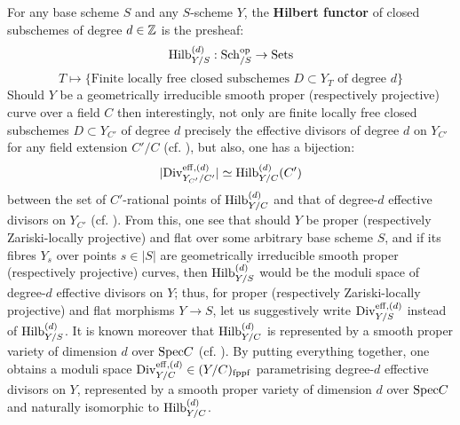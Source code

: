             \begin{remark} \label{remark: moduli_space_of_effective_divisors}
                For any base scheme $S$ and any $S$-scheme $Y$, the \textbf{Hilbert functor} of closed subschemes of degree $d \in \mathbb{Z}$ is the presheaf:
                    $$\mathrm{Hilb}_{Y/S}^{(d)}: \mathrm{Sch}_{/S}^{\mathrm{op}} \to \mathrm{Sets}$$
                    $$T \mapsto \{\text{Finite locally free closed subschemes $D \subset Y_T$ of degree $d$}\}$$
                Should $Y$ be a geometrically irreducible smooth proper (respectively projective) curve over a field $C$ then interestingly, not only are finite locally free closed subschemes $D \subset Y_{C'}$ of degree $d$ precisely the effective divisors of degree $d$ on $Y_{C'}$ for any field extension $C'/C$ (cf. \cite[\href{https://stacks.math.columbia.edu/tag/0B9D}{Tag 0B9D}]{stacks}), but also, one has a bijection:
                    $$|\mathrm{Div}_{Y_{C'}/C'}^{\mathrm{eff}, (d)}| \simeq \mathrm{Hilb}_{Y/C}^{(d)}(C')$$
                between the set of $C'$-rational points of $\mathrm{Hilb}_{Y/C}^{(d)}$ and that of degree-$d$ effective divisors on $Y_{C'}$ (cf. \cite[\href{https://stacks.math.columbia.edu/tag/0B9I}{Tag 0B9I}]{stacks}). From this, one see that should $Y$ be proper (respectively Zariski-locally projective) and flat over some arbitrary base scheme $S$, and if its fibres $Y_s$ over points $s \in |S|$ are geometrically irreducible smooth proper (respectively projective) curves, then $\mathrm{Hilb}_{Y/S}^{(d)}$ would be the moduli space of degree-$d$ effective divisors on $Y$; thus, for proper (respectively Zariski-locally projective) and flat morphisms $Y \to S$, let us suggestively write $\mathrm{Div}_{Y/S}^{\mathrm{eff}, (d)}$ instead of $\mathrm{Hilb}_{Y/S}^{(d)}$. It is known moreover that $\mathrm{Hilb}_{Y/C}^{(d)}$ is represented by a smooth proper variety of dimension $d$ over $\mathrm{Spec} C$ (cf. \cite[\href{https://stacks.math.columbia.edu/tag/0B9I}{Tag 0B9I}]{stacks}). By putting everything together, one obtains a moduli space $\mathrm{Div}_{Y/C}^{\mathrm{eff}, (d)} \in (Y/C)_{\mathrm{fppf}}$ parametrising degree-$d$ effective divisors on $Y$, represented by a smooth proper variety of dimension $d$ over $\mathrm{Spec} C$ and naturally isomorphic to $\mathrm{Hilb}_{Y/C}^{(d)}$.
            \end{remark}
            
